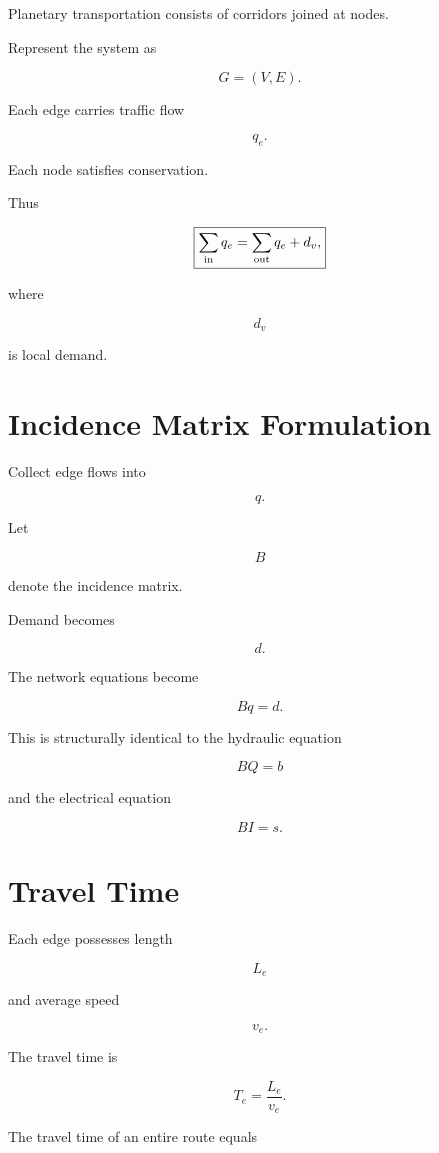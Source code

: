 \documentclass[11pt,fleqn]{book}
\numberwithin{equation}{chapter}
\theoremstyle{plain}
\theoremstyle{definition}
\theoremstyle{remark}
\begin{document}
Planetary transportation consists of corridors joined at nodes.

Represent the system as

\[
G=(V,E).
\]

Each edge carries traffic flow

\[
q_e.
\]

Each node satisfies conservation.

Thus

\[
\boxed{
\sum_{\rm in}
q_e
=
\sum_{\rm out}
q_e
+
d_v,
}
\]

where

\[
d_v
\]

is local demand.


\section{Incidence Matrix Formulation}

Collect edge flows into

\[
q.
\]

Let

\[
B
\]

denote the incidence matrix.

Demand becomes

\[
d.
\]

The network equations become

\[
\boxed{
Bq=d.
}
\]

This is structurally identical to the hydraulic equation

\[
BQ=b
\]

and the electrical equation

\[
BI=s.
\]


\section{Travel Time}

Each edge possesses length

\[
L_e
\]

and average speed

\[
v_e.
\]

The travel time is

\[
\boxed{
T_e
=
\frac{L_e}{v_e}.
}
\]

The travel time of an entire route equals
\end{document}

